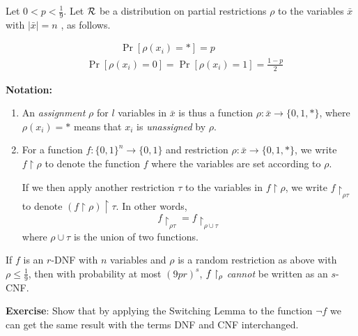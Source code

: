 \bigskip 

\begin{definition}
 Let $0< p<\frac{1}{9}$.
Let $\mathcal{R}$ be a distribution on partial restrictions $\rho$ to the variables $\bar{x}$ with $|\bar{x}|=n$ , as follows.

$$
\begin{aligned}
& ~~~~~~~~~~~ \quad \operatorname{Pr}\left[\rho\left(x_i\right)=*\right]=p \\
& \operatorname{Pr}\left[\rho\left(x_i\right)=0\right]=\operatorname{Pr}\left[\rho\left(x_i\right)=1\right]=\frac{1-p}{2}
\end{aligned}
$$
\end{definition}


\textbf{Notation:} 
\begin{enumerate}
\item 
 An \textit{assignment} $\rho$ for $l$ variables in $\bar{x}$ is thus a function $\rho: \bar{x} \to \{0,1, *\}$, where $\rho(x_i) = *$ means that $x_i$ is \textit{unassigned} by $\rho$.

 
\item For a function $f: \{0,1\}^n \to \{0,1\}$ and restriction $\rho: \bar{x} \to \{0,1, *\}$, we write $f\upharpoonright \rho$ to denote the function $f$ where the variables are set according to $\rho$.

If we then apply another restriction $\tau$ to the variables in $f\upharpoonright \rho$, we 
write $f\upharpoonright_{\rho\tau}$ to denote $(f\upharpoonright \rho)\upharpoonright \tau$. In other words,
\[
f\upharpoonright_{\rho\tau} = f\upharpoonright_{\rho \cup \tau}
\]
where $\rho \cup \tau$ is the union of two functions.
\end{enumerate}

\begin{tcolorbox}[colframe=white, colback=blue!5, boxrule=0mm, sharp corners]
\begin{theorem}
If $f$ is an $r$-DNF with $n$ variables and $\rho$ is a random restriction as above with $\rho \leq \frac{1}{9}$, then with probability at most $(9pr)^s$, $f\upharpoonright_\rho$ \emph{cannot} be written as an $s$-CNF.
\end{theorem}
\end{tcolorbox}

\textbf{Exercise}: Show that by applying the Switching Lemma to the function $\neg f$ we can get the same result with the terms DNF and CNF interchanged.

